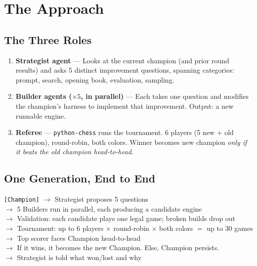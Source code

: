 \documentclass[11pt]{article}
\begin{document}
\section{The Approach}

\subsection{The Three Roles}

\begin{enumerate}[leftmargin=*]
    \item \textbf{Strategist agent} --- Looks at the current champion (and prior round results) and asks 5 distinct improvement questions, spanning categories: prompt, search, opening book, evaluation, sampling.
    \item \textbf{Builder agents ($\times 5$, in parallel)} --- Each takes one question and modifies the champion's harness to implement that improvement. Output: a new runnable engine.
    \item \textbf{Referee} --- \texttt{python-chess} runs the tournament. 6 players (5 new + old champion), round-robin, both colors. Winner becomes new champion \emph{only if it beats the old champion head-to-head}.
\end{enumerate}

\subsection{One Generation, End to End}

\begin{tcolorbox}[colback=gray!5,colframe=gray!50,arc=2mm]
\texttt{[Champion]} $\rightarrow$ Strategist proposes 5 questions \\
\hspace*{2em}$\rightarrow$ 5 Builders run in parallel, each producing a candidate engine \\
\hspace*{2em}$\rightarrow$ Validation: each candidate plays one legal game; broken builds drop out \\
\hspace*{2em}$\rightarrow$ Tournament: up to 6 players $\times$ round-robin $\times$ both colors $=$ up to 30 games \\
\hspace*{2em}$\rightarrow$ Top scorer faces Champion head-to-head \\
\hspace*{2em}$\rightarrow$ If it wins, it becomes the new Champion. Else, Champion persists. \\
\hspace*{2em}$\rightarrow$ Strategist is told what won/lost and why
\end{tcolorbox}
\end{document}
